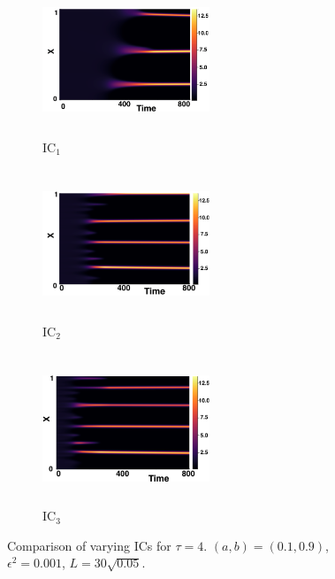 \begin{figure}[H]
    \centering
    \begin{subfigure}[b]{0.32\textwidth}
        \centering
        \includegraphics[width=5cm,height=4.5cm]{gaff4.png}
        \caption{$\text{IC}_1$}
        \label{}
    \end{subfigure}
    \hfill
    \begin{subfigure}[b]{0.32\textwidth}
        \centering
        \includegraphics[width=5cm,height=4.5cm]{ic24.png}
        \caption{$\text{IC}_2$}
        \label{}
    \end{subfigure}
    \hfill
    \begin{subfigure}[b]{0.32\textwidth}
        \centering
        \includegraphics[width=5cm,height=4.5cm]{ic34.png}
        \caption{$\text{IC}_3$}
        \label{}
    \end{subfigure}
    \caption{Comparison of varying ICs for $\tau=4$. $(a,b)=(0.1,0.9)$, $\epsilon^2=0.001$, $L=30\sqrt{0.05}$.}
    \label{fig:figtau4}
\end{figure}
